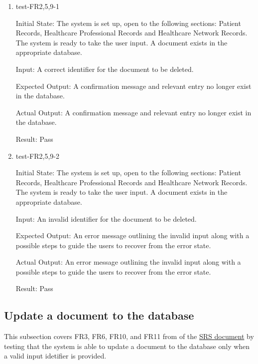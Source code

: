 \documentclass[12pt, titlepage]{article}
\begin{document}
\begin{enumerate}

  \item{test-FR2,5,9-1} \label{test-FR2,5,9-1}
  
  Initial State: The system is set up, open to the following sections: Patient Records, Healthcare Professional Records and Healthcare Network Records. The system is ready to take the user input. A document exists in the appropriate database.

  Input: A correct identifier for the document to be deleted.

  Expected Output: A confirmation message and relevant entry no longer exist in the database.

  Actual Output: A confirmation message and relevant entry no longer exist in the database.

  Result: Pass


  \item{test-FR2,5,9-2} \label{test-FR2,5,9-2}

  Initial State: The system is set up, open to the following sections: Patient Records, Healthcare Professional Records and Healthcare Network Records. The system is ready to take the user input. A document exists in the appropriate database.

  Input: An invalid identifier for the document to be deleted.

  Expected Output: An error message outlining the invalid input along with a possible steps to guide the users to recover from the error state.

  Actual Output: An error message outlining the invalid input along with a possible steps to guide the users to recover from the error state.

  Result: Pass

\end{enumerate}

\subsection{Update a document to the database} \label{section:3.3}

This subsection covers FR3, FR6, FR10, and FR11 from of the \href{https://github.com/Inreet-Kaur/capstone/blob/main/docs/SRS/SRS.pdf}{SRS document} by testing that the system is able to update a document to the database only when a valid input idetifier is provided.
\end{document}
